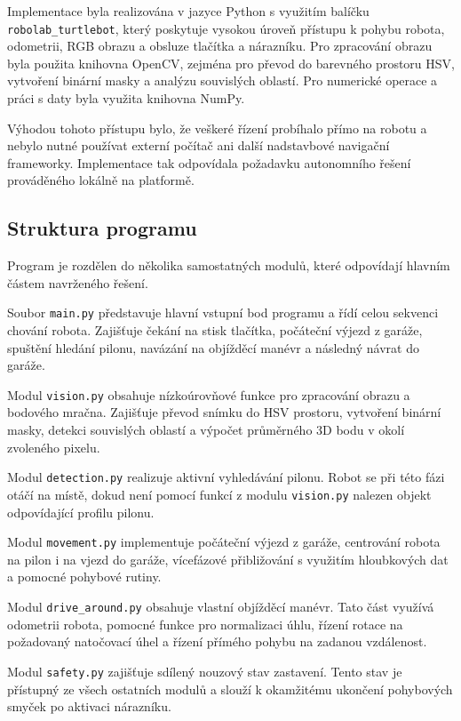 \documentclass[a4paper,11pt]{article}
\begin{document}
Implementace byla realizována v jazyce Python s využitím balíčku \texttt{robolab\_turtlebot}, který poskytuje vysokou úroveň přístupu k pohybu robota, odometrii, RGB obrazu a obsluze tlačítka a nárazníku. Pro zpracování obrazu byla použita knihovna OpenCV, zejména pro převod do barevného prostoru HSV, vytvoření binární masky a analýzu souvislých oblastí. Pro numerické operace a práci s daty byla využita knihovna NumPy.

Výhodou tohoto přístupu bylo, že veškeré řízení probíhalo přímo na robotu a nebylo nutné používat externí počítač ani další nadstavbové navigační frameworky. Implementace tak odpovídala požadavku autonomního řešení prováděného lokálně na platformě.

\subsection{Struktura programu}
Program je rozdělen do několika samostatných modulů, které odpovídají hlavním částem navrženého řešení.

Soubor \texttt{main.py} představuje hlavní vstupní bod programu a řídí celou sekvenci chování robota. Zajišťuje čekání na stisk tlačítka, počáteční výjezd z garáže, spuštění hledání pilonu, navázání na objížděcí manévr a následný návrat do garáže.

Modul \texttt{vision.py} obsahuje nízkoúrovňové funkce pro zpracování obrazu a bodového mračna. Zajišťuje převod snímku do HSV prostoru, vytvoření binární masky, detekci souvislých oblastí a výpočet průměrného 3D bodu v okolí zvoleného pixelu.

Modul \texttt{detection.py} realizuje aktivní vyhledávání pilonu. Robot se při této fázi otáčí na místě, dokud není pomocí funkcí z modulu \texttt{vision.py} nalezen objekt odpovídající profilu pilonu.

Modul \texttt{movement.py} implementuje počáteční výjezd z garáže, centrování robota na pilon i na vjezd do garáže, vícefázové přibližování s využitím hloubkových dat a pomocné pohybové rutiny.

Modul \texttt{drive\_around.py} obsahuje vlastní objížděcí manévr. Tato část využívá odometrii robota, pomocné funkce pro normalizaci úhlu, řízení rotace na požadovaný natočovací úhel a řízení přímého pohybu na zadanou vzdálenost.

Modul \texttt{safety.py} zajišťuje sdílený nouzový stav zastavení. Tento stav je přístupný ze všech ostatních modulů a slouží k okamžitému ukončení pohybových smyček po aktivaci nárazníku.
\end{document}
